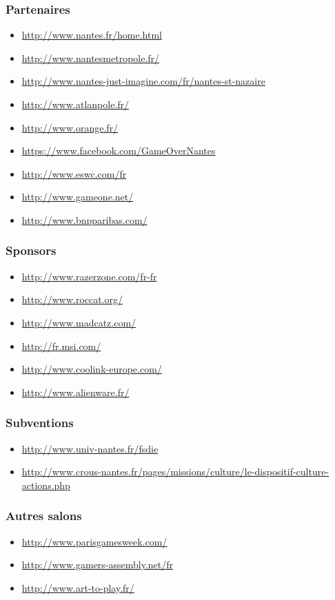 \documentclass[french]{article}
\begin{document}
\subsubsection*{Partenaires}
\begin{itemize}
\item \url{http://www.nantes.fr/home.html}
\item \url{http://www.nantesmetropole.fr/}
\item \url{http://www.nantes-just-imagine.com/fr/nantes-st-nazaire}
\item \url{http://www.atlanpole.fr/}
\item \url{http://www.orange.fr/}
\item \url{https://www.facebook.com/GameOverNantes}
\item \url{http://www.eswc.com/fr}
\item \url{http://www.gameone.net/}
\item \url{http://www.bnpparibas.com/}
\end{itemize}

\subsubsection*{Sponsors}
\begin{itemize}
\item \url{http://www.razerzone.com/fr-fr}
\item \url{http://www.roccat.org/}
\item \url{http://www.madcatz.com/}
\item \url{http://fr.msi.com/}
\item \url{http://www.coolink-europe.com/}
\item \url{http://www.alienware.fr/}
\end{itemize}

\subsubsection*{Subventions}
\begin{itemize}
\item \url{http://www.univ-nantes.fr/fsdie}
\item \url{http://www.crous-nantes.fr/pages/missions/culture/le-dispositif-culture-actions.php}
\end{itemize}

\subsubsection*{Autres salons}
\begin{itemize}
\item \url{http://www.parisgamesweek.com/}
\item \url{http://www.gamers-assembly.net/fr}
\item \url{http://www.art-to-play.fr/}
\end{itemize}
\end{document}
